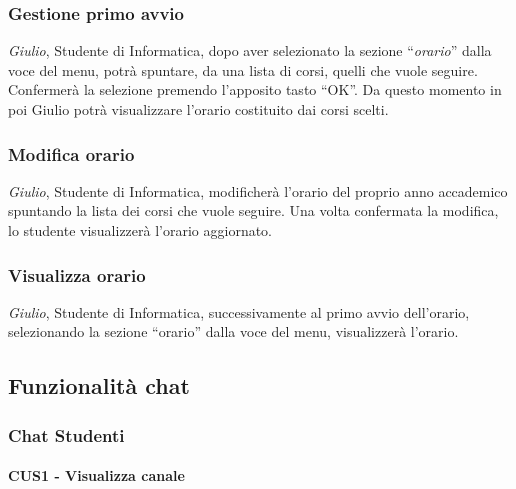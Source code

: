\subsubsection{Gestione primo avvio}
\textit{Giulio}, Studente di Informatica, dopo aver selezionato la sezione “\textit{orario}” dalla voce del menu, potrà spuntare, da una lista di corsi, quelli che vuole seguire. Confermerà la selezione premendo l’apposito tasto “OK”. Da questo momento in poi Giulio potrà visualizzare l’orario costituito dai corsi scelti.


\subsubsection{Modifica orario}
\textit{Giulio}, Studente di Informatica, modificherà l’orario del proprio anno accademico spuntando la lista dei corsi che vuole seguire. Una volta confermata la modifica, lo studente visualizzerà l’orario aggiornato.


\subsubsection{Visualizza orario}
\textit{Giulio}, Studente di Informatica, successivamente al primo avvio dell’orario, selezionando la sezione “orario” dalla voce del menu, visualizzerà l’orario.

\subsection{Funzionalità chat}

\subsubsection{Chat Studenti}
\paragraph{CUS1 - Visualizza canale}

